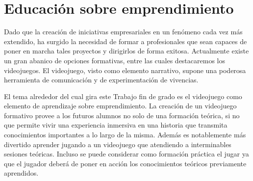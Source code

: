 \section{Educación sobre emprendimiento}

Dado que la creación de iniciativas empresariales en un fenómeno cada vez más extendido, ha surgido la necesidad de formar a profesionales que sean capaces de poner en marcha tales proyectos y dirigirlos de forma exitosa. Actualmente existe un gran abanico de opciones formativas, entre las cuales destacaremos los videojuegos. El videojuego, visto como elemento narrativo, supone una poderosa herramienta de comunicación y de experimentación de vivencias. 

El tema alrededor del cual gira este Trabajo fin de grado es el videojuego como elemento de aprendizaje sobre emprendimiento. La creación de un videojuego formativo provee a los futuros alumnos no solo de una formación teórica, si no que permite vivir una experiencia inmersiva en una historia que transmita conocimientos importantes a lo largo de la misma. Además es notablemente más divertido aprender jugando a un videojuego que atendiendo a interminables sesiones teóricas. Incluso se puede considerar como formación práctica el jugar ya que el jugador deberá de poner en acción los conocimientos teóricos previamente aprendidos.




